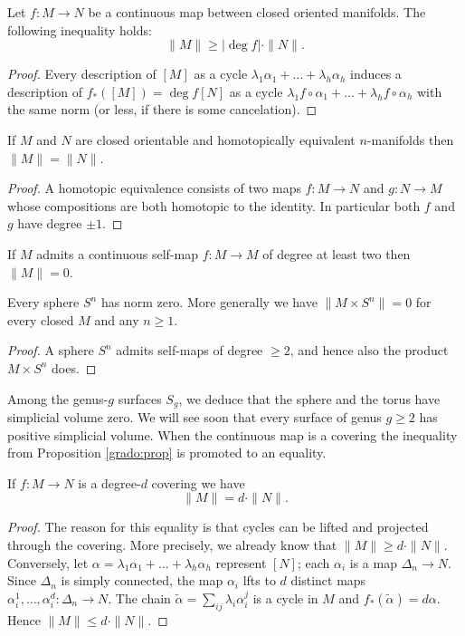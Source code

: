 \begin{prop} \label{grado:prop}
Let $f\colon M\to N$ be a continuous map between closed oriented manifolds. The following inequality holds:
$$\|M\| \geqslant |\deg f| \cdot \|N\|.$$
\end{prop}
\begin{proof}
Every description of $[M]$ as a cycle $\lambda_1\alpha_1+\ldots +\lambda_h\alpha_h$ induces a description of $f_*([M]) = \deg f[N]$ as a cycle $\lambda_1f\circ\alpha_1+\ldots +\lambda_hf\circ\alpha_h$ with the same norm (or less, if there is some cancelation). 
\end{proof}

\begin{cor}
If $M$ and $N$ are closed orientable and homotopically equivalent $n$-manifolds then $\|M\|=\|N\|$.
\end{cor}
\begin{proof}
A homotopic equivalence consists of two maps $f\colon M\to N$ and $g\colon N \to M$ whose compositions are both homotopic to the identity. In particular both $f$ and $g$ have degree $\pm 1$.
\end{proof}

\begin{cor}
If $M$ admits a continuous self-map $f\colon M \to M$ of degree at least two then $\|M\| = 0$.
\end{cor}
\begin{cor}
Every sphere $S^n$ has norm zero. More generally we have $\|M\times S^n\|=0$ for every closed $M$ and any $n\geqslant 1$.
\end{cor}
\begin{proof}
A sphere $S^n$ admits self-maps of degree $\geqslant 2$, and hence also the product $M\times S^n$ does.
\end{proof}
Among the genus-$g$ surfaces $S_g$, we deduce that the sphere and the torus have simplicial volume zero. We will see soon that every surface of genus $g\geqslant 2$ has positive simplicial volume. When the continuous map is a covering the inequality from Proposition \ref{grado:prop} is promoted to an equality.

\begin{prop}
If $f\colon M \to N$ is a degree-$d$ covering we have 
$$\|M\| = d \cdot \|N \|.$$
\end{prop}
\begin{proof} 
The reason for this equality is that cycles can be lifted and projected through the covering. More precisely, we already know that $\|M\|\geqslant d\cdot \|N\|$. Conversely, let $\alpha = \lambda_1\alpha_1+\ldots +\lambda_h\alpha_h$ represent $[N]$; each $\alpha_i$ is a map $\Delta_n\to N$. Since $\Delta_n$ is simply connected, the map $\alpha_i$ lfts to $d$ distinct maps $\alpha_i^1,\ldots, \alpha_i^d\colon \Delta_n\to N$. The chain $\tilde\alpha = \sum_{ij} \lambda_i\alpha_i^j$ is a cycle in $M$ and $f_*(\tilde \alpha) = d\alpha$. Hence $\|M\|\leqslant d\cdot \|N\|$.
\end{proof}

